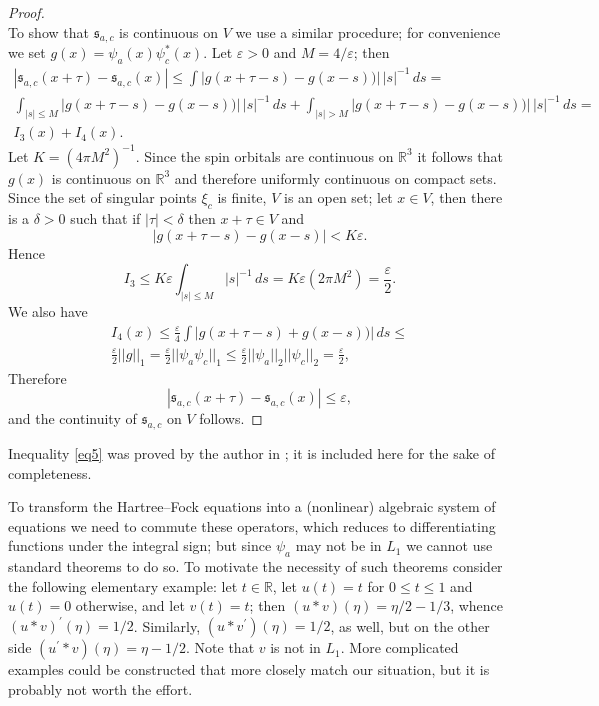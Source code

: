 \documentclass[english, reqno]{amsart}
\newcommand{\IR}{\text{${\mathbb{R}}$}}
\newcommand{\s}{\mathfrak{s}}
\begin{document}
\begin{proof}
\begin{equation}
\end{equation}
To show that $\s_{a,c}$ is continuous on $V$ we use a similar procedure; for convenience we set $g(x)=\psi_a(x)\psi_c^{\ast}(x)$. 
Let $\varepsilon > 0$ and $M=4/\varepsilon$; then
\begin{multline*}
|\s_{a,c}(x+\tau)-\s_{a,c}(x)| \le \int |g(x+\tau-s)-g(x-s))| \, |s|^{-1} \, ds= \\
 \int_{|s|\le M} |g(x+\tau-s)-g(x-s))| \, |s|^{-1} \,ds + \int _{|s| > M}|g(x+\tau-s)-g(x-s))| \, |s|^{-1} \,ds =\\
 I_3(x)+I_4(x).
\end{multline*}
Let $K= (4 \pi M^2)^{-1}$. Since the spin orbitals are continuous on 
$\IR^3$ it follows that $g(x)$ is continuous on $\IR^3$ and therefore uniformly continuous on compact sets. Since the set of singular 
points $\xi_c$ is finite, $V$ is an open set; let $x \in V$, then there is a $\delta > 0$ such that if $|\tau| < \delta$ then $x+\tau \in V$ and
\[
|g(x+\tau-s)-g(x-s)| <K\varepsilon.
\]
Hence
\[
I_3 \le K\varepsilon \int_{|s| \le M}|s|^{-1}\, ds=K\varepsilon (2\pi M^2)=\frac{\varepsilon}{2}.
\]
We also have
\begin{multline*}
I_4(x) \le \frac{\varepsilon}{4} \int |g(x+\tau-s)+g(x-s))| \,ds \le \\
\frac{\varepsilon}{2} ||g||_1= \frac{\varepsilon}{2}||\psi_a \psi_c||_1 \le \frac{\varepsilon}{2}||\psi_a||_2 ||\psi_c||_2=\frac{\varepsilon}{2},
\end{multline*}
Therefore 
\[
|\s_{a,c}(x+\tau)-\s_{a,c}(x)| \le \varepsilon,
\]
and the continuity of $\s_{a,c}$ on $V$ follows.

\end{proof}
Inequality \eqref{eq5} was proved by the author in \cite[Lemma 1]{Za1}; it is included here for the sake of completeness.


To transform the Hartree--Fock equations into a (nonlinear) algebraic system of equations we need to commute these operators, which reduces to differentiating functions under the integral sign; but since $\psi_a$ may not be in $L_1$ we cannot use standard theorems to do so. To motivate the necessity of such theorems consider the following elementary example: let $t \in \IR$, let $u(t)=t$ for $0 \le t \le 1$ and $u(t)=0$ otherwise, and let $v(t)=t$; then $(u \ast v)(\eta)=\eta/2 -1/3$, whence $(u \ast v)^{\prime}(\eta)=1/2$. Similarly, $(u \ast v^{\prime})(\eta)=1/2$, as well, but on the other side $(u ^{\prime}\ast v)(\eta)= \eta-1/2$. Note that $v$ is not in $L_1$. More complicated examples could be constructed that more closely match our situation, but it is probably not worth the effort.
\end{document}
